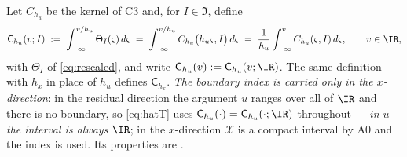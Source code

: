 %

%

\begin{definition}\label{def:intker}
Let $C_{h_u}$ be the kernel of C3 and, for $I\in\mathfrak I$, define
\begin{equation}\label{eq:intker}
\mathsf C_{h_u}(v;I)\;:=\;\int_{-\infty}^{v/h_u}\Theta_{I}(\varsigma)\,d\varsigma
\;=\;\int_{-\infty}^{v/h_u}C_{h_u}\big(h_u\varsigma,I\big)\,d\varsigma
\;=\;\frac1{h_u}\int_{-\infty}^{v}C_{h_u}(\varsigma,I)\,d\varsigma ,
\qquad v\in\IR ,
\end{equation}
with $\Theta_{I}$ of \eqref{eq:rescaled}, and write $\mathsf C_{h_u}(v):=\mathsf C_{h_u}(v;\IR)$. The same definition with $h_x$ in place of $h_u$
defines $\mathsf C_{h_x}$. \emph{The boundary index is carried only in the $x$-direction}: in the
residual direction the argument $u$ ranges over all of $\IR$ and there is no boundary, so
\eqref{eq:hatT} uses $\mathsf C_{h_u}(\cdot)=\mathsf C_{h_u}(\cdot;\IR)$ throughout --- \emph{in $u$ the
interval is always $\IR$}; in the
$x$-direction $\mathcal X$ is a compact interval by A0 and the index is used.
Its properties are .
\end{definition}


